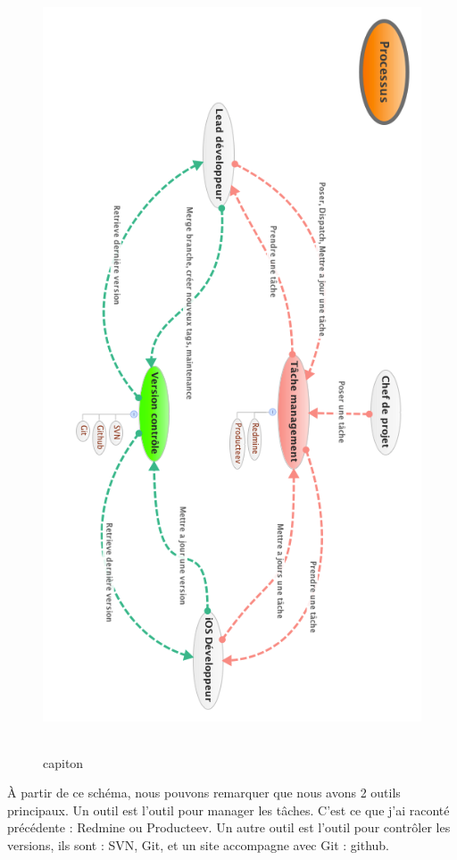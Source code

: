 \begin{figure}[htbp]
	\centering
		\includegraphics[height=9in]{XMinds/ProcessusMobile.png}
	\caption{capiton}
	\label{fig:XMinds_ProcessusMobile}
\end{figure}


À partir de ce schéma, nous pouvons remarquer que nous avons 2 outils principaux. Un outil est l'outil pour manager les tâches. C'est ce que j'ai raconté précédente : Redmine ou Producteev. Un autre outil est l'outil pour contrôler les versions, ils sont : SVN, Git, et un site accompagne avec Git : github. 

